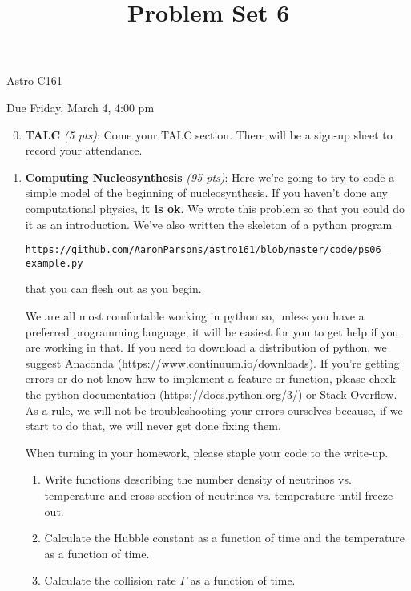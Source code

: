 \documentclass[12pt,preprint]{aastex}
\title{Problem Set 6}
\begin{document}
\maketitle
\centerline{Astro C161} 

\centerline{Due Friday, March 4, 4:00 pm}

\begin{enumerate}
\setcounter{enumi}{-1}

\item \textbf{TALC} \textit{(5 pts)}: Come your TALC section. There will be a sign-up sheet to record your attendance. 

\item \textbf{Computing Nucleosynthesis} \textit{(95 pts)}: Here we're going to try to code a simple model of the beginning of nucleosynthesis. If you haven't done any computational physics, \textbf{it is ok}. We wrote this problem so that you could do it as an introduction. We've also written the skeleton of a python program \small \begin{verbatim}
https://github.com/AaronParsons/astro161/blob/master/code/ps06_ example.py 
\end{verbatim}
\normalsize that you can flesh out as you begin. 

We are all most comfortable working in python so, unless you have a preferred programming language, it will be easiest for you to get help if you are working in that. If you need to download a distribution of python, we suggest Anaconda \linebreak (https://www.continuum.io/downloads). If you're getting errors or do not know how to implement a feature or function, please check the python documentation \linebreak (https://docs.python.org/3/) or Stack Overflow. As a rule, we will not be troubleshooting your errors ourselves because, if we start to do that, we will never get done fixing them.

When turning in your homework, please staple your code to the write-up.
 
\begin{enumerate}
	\item Write functions describing the number density of neutrinos vs. temperature
 and cross section of neutrinos vs. temperature until freeze-out.
 
	\item Calculate the Hubble constant as a function of time and the temperature as a function of time.

	\item Calculate the collision rate $\Gamma$ as a function of time.
	

\end{enumerate}
\end{enumerate}
\end{document}
